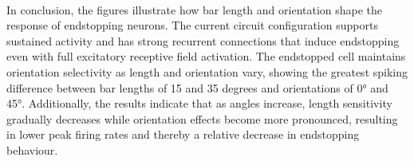 \documentclass[12pt]{article}
\begin{document}
\\
In conclusion, the figures illustrate how bar length and orientation shape the response of endstopping neurons. The current circuit configuration supports sustained activity and has strong recurrent connections that induce endstopping even with full excitatory receptive field activation. The endstopped cell maintains orientation selectivity as length and orientation vary, showing the greatest spiking difference between bar lengths of 15 and 35 degrees and orientations of 0° and 45°. Additionally, the results indicate that as angles increase, length sensitivity gradually decreases while orientation effects become more pronounced, resulting in lower peak firing rates and thereby a relative decrease in endstopping behaviour.
\vspace*{-\headsep}
\vspace*{-\headheight}
\vspace*{-60pt} %
\end{document}
